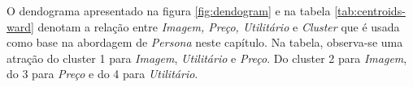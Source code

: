 O dendograma apresentado na figura \ref{fig:dendogram} e na tabela
\ref{tab:centroids-ward} denotam a relação entre \emph{Imagem, Preço,
Utilitário }e\emph{ Cluster }que é usada como base na abordagem de
\emph{Persona }neste capítulo. Na tabela, observa-se uma atração do
cluster 1 para \emph{Imagem}, \emph{Utilitário} e \emph{Preço}. Do
cluster 2 para \emph{Imagem}, do 3 para \emph{Preço} e do 4 para \emph{Utilitário}.

